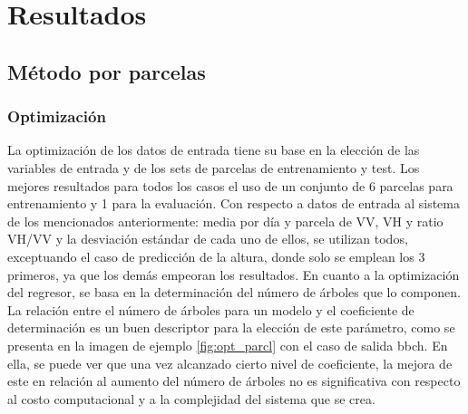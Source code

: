 
\chapter{Resultados}
\label{resultados}
\section{Método por parcelas}
\subsection{Optimización}
\par La optimización de los datos de entrada tiene su base en la elección de las variables de entrada y de los sets de parcelas de entrenamiento y test. Los mejores resultados para todos los casos el uso de un conjunto de 6 parcelas para entrenamiento y 1 para la evaluación. Con respecto a datos de entrada al sistema de los mencionados anteriormente: media por día y parcela de VV, VH y ratio VH/VV y la desviación estándar de cada uno de ellos, se utilizan todos, exceptuando el caso de predicción de la altura, donde solo se emplean los 3 primeros, ya que los demás empeoran los resultados. En cuanto a la optimización del regresor, se basa en la determinación del número de árboles que lo componen. La relación entre el número de árboles para un modelo y el coeficiente de determinación es un buen descriptor para la elección de este parámetro, como se presenta en la imagen de ejemplo \ref{fig:opt_parcl} con el caso de salida \gls{bbch}. En ella, se puede ver que una vez alcanzado cierto nivel de coeficiente, la mejora de este en relación al aumento del número de árboles no es significativa con respecto al costo computacional y a la complejidad del sistema que se crea. 
